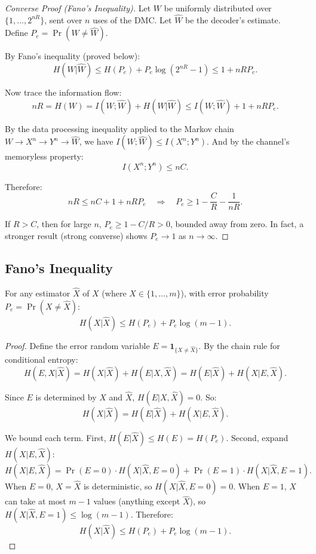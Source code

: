 \begin{proof}[Converse Proof (Fano's Inequality)]
Let $W$ be uniformly distributed over $\{1,\dots,2^{nR}\}$, sent over $n$ uses of the DMC. Let $\hat{W}$ be the decoder's estimate. Define $P_e = \Pr(W \neq \hat{W})$.

By Fano's inequality (proved below):
\[
H(W|\hat{W}) \le H(P_e) + P_e \log(2^{nR}-1) \le 1 + nR P_e.
\]

Now trace the information flow:
\[
nR = H(W) = I(W;\hat{W}) + H(W|\hat{W}) \le I(W;\hat{W}) + 1 + nR P_e.
\]

By the data processing inequality applied to the Markov chain $W \to X^n \to Y^n \to \hat{W}$, we have $I(W;\hat{W}) \le I(X^n;Y^n)$. And by the channel's memoryless property:
\[
I(X^n;Y^n) \le n C.
\]

Therefore:
\[
nR \le nC + 1 + nR P_e \quad \Longrightarrow \quad P_e \ge 1 - \frac{C}{R} - \frac{1}{nR}.
\]

If $R > C$, then for large $n$, $P_e \ge 1 - C/R > 0$, bounded away from zero. In fact, a stronger result (strong converse) shows $P_e \to 1$ as $n \to \infty$.
\end{proof}

\subsection{Fano's Inequality}
\label{sec:information:fano}

\begin{theorem}
For any estimator $\hat{X}$ of $X$ (where $X \in \{1,\dots,m\}$), with error probability $P_e = \Pr(X \neq \hat{X})$:
\[
H(X|\hat{X}) \le H(P_e) + P_e \log(m-1).
\]
\end{theorem}

\begin{proof}
Define the error random variable $E = \mathbf{1}_{\{X \neq \hat{X}\}}$. By the chain rule for conditional entropy:
\[
H(E,X|\hat{X}) = H(X|\hat{X}) + H(E|X,\hat{X}) = H(E|\hat{X}) + H(X|E,\hat{X}).
\]

Since $E$ is determined by $X$ and $\hat{X}$, $H(E|X,\hat{X}) = 0$. So:
\[
H(X|\hat{X}) = H(E|\hat{X}) + H(X|E,\hat{X}).
\]

We bound each term. First, $H(E|\hat{X}) \le H(E) = H(P_e)$. Second, expand $H(X|E,\hat{X})$:
\[
H(X|E,\hat{X}) = \Pr(E=0) \cdot H(X|\hat{X},E=0) + \Pr(E=1) \cdot H(X|\hat{X},E=1).
\]
When $E=0$, $X=\hat{X}$ is deterministic, so $H(X|\hat{X},E=0) = 0$. When $E=1$, $X$ can take at most $m-1$ values (anything except $\hat{X}$), so $H(X|\hat{X},E=1) \le \log(m-1)$. Therefore:
\[
H(X|\hat{X}) \le H(P_e) + P_e \log(m-1).
\]
\end{proof}

